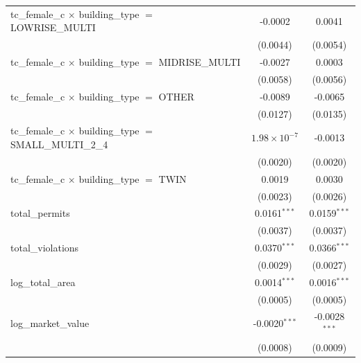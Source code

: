 \begin{tabular}{lcc}
   tc\_female\_c $\times$ building\_type $=$ LOWRISE\_MULTI            & -0.0002               & 0.0041\\   
                                                                       & (0.0044)              & (0.0054)\\   
   tc\_female\_c $\times$ building\_type $=$ MIDRISE\_MULTI            & -0.0027               & 0.0003\\   
                                                                       & (0.0058)              & (0.0056)\\   
   tc\_female\_c $\times$ building\_type $=$ OTHER                     & -0.0089               & -0.0065\\   
                                                                       & (0.0127)              & (0.0135)\\   
   tc\_female\_c $\times$ building\_type $=$ SMALL\_MULTI\_2\_4        & $1.98\times 10^{-7}$  & -0.0013\\   
                                                                       & (0.0020)              & (0.0020)\\   
   tc\_female\_c $\times$ building\_type $=$ TWIN                      & 0.0019                & 0.0030\\   
                                                                       & (0.0023)              & (0.0026)\\   
   total\_permits                                                      & 0.0161$^{***}$        & 0.0159$^{***}$\\   
                                                                       & (0.0037)              & (0.0037)\\   
   total\_violations                                                   & 0.0370$^{***}$        & 0.0366$^{***}$\\   
                                                                       & (0.0029)              & (0.0027)\\   
   log\_total\_area                                                    & 0.0014$^{***}$        & 0.0016$^{***}$\\   
                                                                       & (0.0005)              & (0.0005)\\   
   log\_market\_value                                                  & -0.0020$^{***}$       & -0.0028$^{***}$\\   
                                                                       & (0.0008)              & (0.0009)\\   

\end{tabular}
